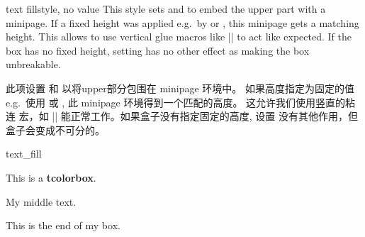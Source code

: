 \begin{docTcbKey}[][doc new=2015-07-15]{text fill}{}{style, no value}
This style sets  and 
to embed the upper part with a minipage. If a fixed height was applied
e.g.\ by  or , this minipage
gets a matching height. This allows to use vertical glue macros like
|\vfill| to act like expected. If the box has no fixed height,
setting  has no other effect as making the box
unbreakable. 

此项设置  和 
以将upper部分包围在 minipage 环境中。 如果高度指定为固定的值
e.g.\ 使用  或 , 此 minipage 环境得到一个匹配的高度。 这允许我们使用竖直的粘连%
宏，如 |\vfill| 能正常工作。如果盒子没有指定固定的高度,%
设置  没有其他作用，但盒子会变成不可分的。
\begin{exdispExample}{text_fill}
\begin{tcolorbox}[colback=red!5!white,colframe=red!75!black,fonttitle=\bfseries,
height=8cm,text fill,
title=My filled box]
This is a \textbf{tcolorbox}.
\par\vfill
\begin{center}
My middle text.
\end{center}
\par\vfill
This is the end of my box.
\end{tcolorbox}
\end{exdispExample}
\end{docTcbKey}




